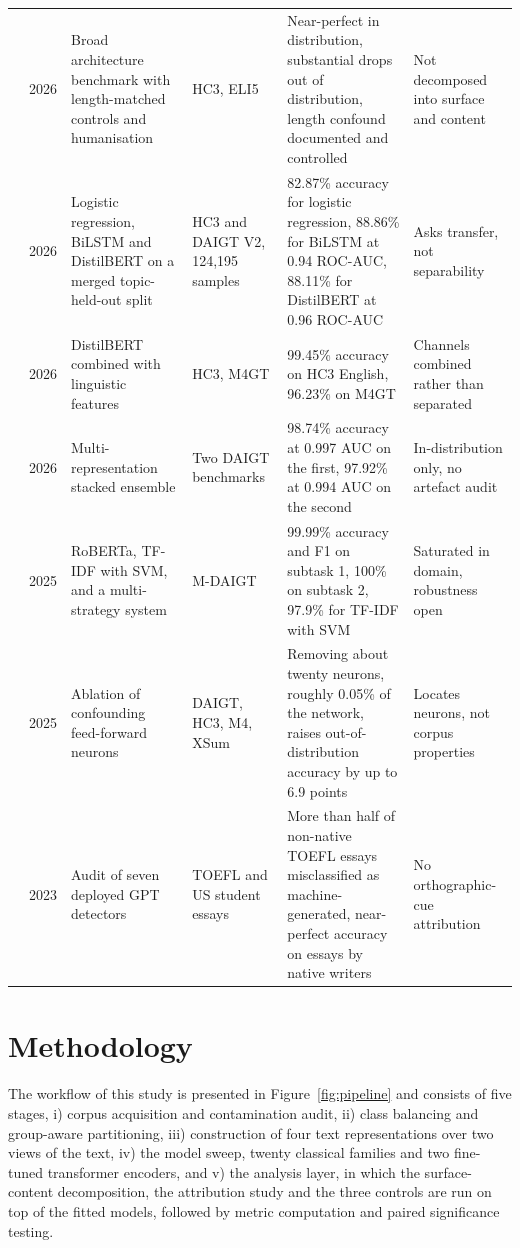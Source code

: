 \documentclass[conference,a4paper]{IEEEtran}
\begin{document}
\begin{table}[!t]
\begin{tabularx}{\textwidth}{@{}clp{2.6cm}p{2.1cm}Xp{2.5cm}@{}}
\cite{Baidya2026detecting} & 2026 & Broad architecture benchmark with length-matched controls and humanisation & HC3, ELI5 & Near-perfect in distribution, substantial drops out of distribution, length confound documented and controlled & Not decomposed into surface and content \\
\cite{Alikhanov2026generated} & 2026 & Logistic regression, BiLSTM and DistilBERT on a merged topic-held-out split & HC3 and DAIGT V2, 124,195 samples & 82.87\% accuracy for logistic regression, 88.86\% for BiLSTM at 0.94 ROC-AUC, 88.11\% for DistilBERT at 0.96 ROC-AUC & Asks transfer, not separability \\
\cite{Annepaka2026synergizing} & 2026 & DistilBERT combined with linguistic features & HC3, M4GT & 99.45\% accuracy on HC3 English, 96.23\% on M4GT & Channels combined rather than separated \\
\cite{Ansary2026multirepresentation} & 2026 & Multi-representation stacked ensemble & Two DAIGT benchmarks & 98.74\% accuracy at 0.997 AUC on the first, 97.92\% at 0.994 AUC on the second & In-distribution only, no artefact audit \\
\cite{Zain2025multi} & 2025 & RoBERTa, TF-IDF with SVM, and a multi-strategy system & M-DAIGT & 99.99\% accuracy and F1 on subtask 1, 100\% on subtask 2, 97.9\% for TF-IDF with SVM & Saturated in domain, robustness open \\
\cite{Borile2025generalize} & 2025 & Ablation of confounding feed-forward neurons & DAIGT, HC3, M4, XSum & Removing about twenty neurons, roughly 0.05\% of the network, raises out-of-distribution accuracy by up to 6.9 points & Locates neurons, not corpus properties \\
\cite{Liang2023gpt} & 2023 & Audit of seven deployed GPT detectors & TOEFL and US student essays & More than half of non-native TOEFL essays misclassified as machine-generated, near-perfect accuracy on essays by native writers & No orthographic-cue attribution \\
\bottomrule
\end{tabularx}
\end{table}

\section{Methodology}
\label{sec:method}

The workflow of this study is presented in Figure~\ref{fig:pipeline} and consists of five stages, i) corpus acquisition and contamination audit, ii) class balancing and group-aware partitioning, iii) construction of four text representations over two views of the text, iv) the model sweep, twenty classical families and two fine-tuned transformer encoders, and v) the analysis layer, in which the surface-content decomposition, the attribution study and the three controls are run on top of the fitted models, followed by metric computation and paired significance testing.
\end{document}
